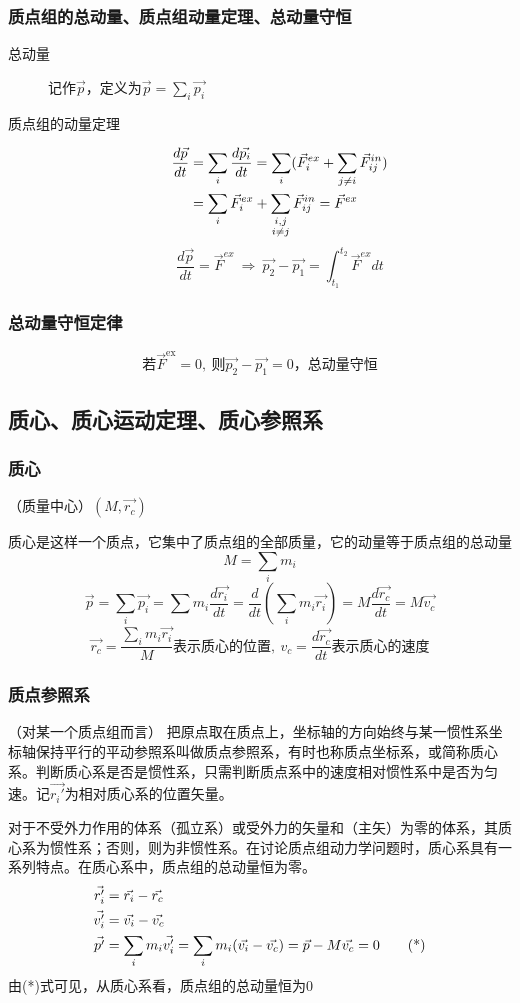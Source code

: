 \subsubsection{质点组的总动量、质点组动量定理、总动量守恒}
\begin{description}
\item[总动量]记作$\vec{p}$，定义为$\vec{p}=\sum_i \vec{p_i}$
\item[质点组的动量定理]
\begin{align}
\frac{d\vec{p}}{dt} &=\sum_i \frac{d\vec{p_i}}{dt} = \sum_i (\vec{F}_i^{ex} + \sum_{j\ne i}\vec{F}_{ij}^{in}) \notag \\
&=\sum_i \vec{F}_i^{ex}+\sum_{ \substack{i,j \\ i\ne j}}\vec{F}_{ij}^{in} = \vec{F}^{ex} \notag
\end{align}
\[\frac{d\vec{p}}{dt}=\vec{F}^{ex}\ \Rightarrow\ \vec{p_2}-\vec{p_1}=\int_{t_1}^{t_2}\vec{F}^{ex}dt\]
\end{description}
\subsubsection{总动量守恒定律}
\[\text{若}\vec{F}^\text{ex}=0,\ \text{则}\vec{p_2}-\vec{p_1}=0\text{，总动量守恒}\]
\subsection{质心、质心运动定理、质心参照系}
\subsubsection{质心}（质量中心）$(M,\vec{r_c})$

质心是这样一个质点，它集中了质点组的全部质量，它的动量等于质点组的总动量
\[M=\sum_i m_i\]
\[\vec{p}=\sum_i \vec{p_i}=\sum m_i \frac{d\vec{r_i}}{dt}=\frac{d}{dt}(\sum_i m_i\vec{r_i})=M\frac{d\vec{r_c}}{dt}=M\vec{v_c}\]
\[\vec{r_c}=\frac{\sum_i m_i\vec{r_i}}{M}\text{表示质心的位置},\  v_c=\frac{d\vec{r_c}}{dt}\text{表示质心的速度}\]
\subsubsection{质点参照系}（对某一个质点组而言）
把原点取在质点上，坐标轴的方向始终与某一惯性系坐标轴保持平行的平动参照系叫做质点参照系，有时也称质点坐标系，或简称质心系。判断质心系是否是惯性系，只需判断质点系中的速度相对惯性系中是否为匀速。记$\vec{r_i'}$为相对质心系的位置矢量。

对于不受外力作用的体系（孤立系）或受外力的矢量和（主矢）为零的体系，其质心系为惯性系；否则，则为非惯性系。在讨论质点组动力学问题时，质心系具有一系列特点。在质心系中，质点组的总动量恒为零。
\begin{align}
\vec{r_i'}&=\vec{r_i}-\vec{r_c} \notag \\
\vec{v_i'}&=\vec{v_i}-\vec{v_c} \notag \\
\vec{p'}&=\sum_i m_i \vec{v_i'}=\sum_i m_i(\vec{v_i}-\vec{v_c}) = \vec{p}-M\vec{v_c}=0 \tag{*}
\end{align}
由(*)式可见，从质心系看，质点组的总动量恒为0
